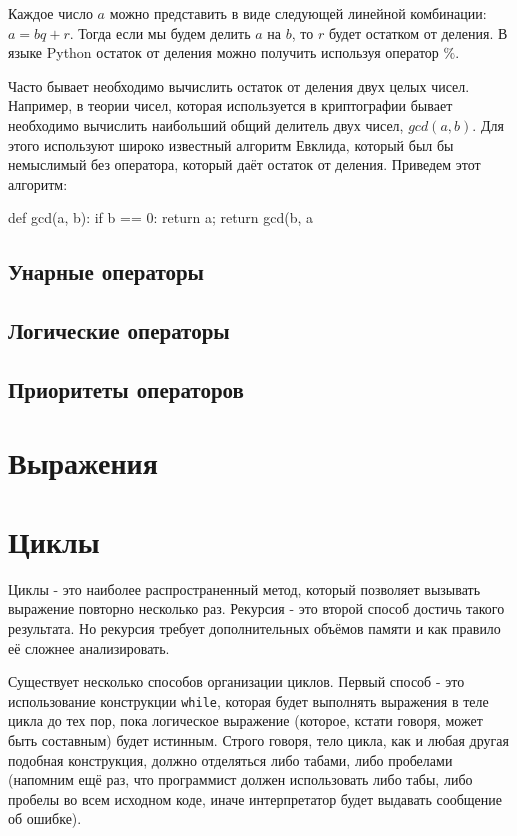 Каждое число $a$ можно представить в виде следующей линейной комбинации: $a=bq+r$.
Тогда если мы будем делить $a$ на $b$, то $r$ будет остатком от деления. В языке Python
остаток от деления можно получить используя оператор $\%$.

Часто бывает необходимо вычислить остаток от деления двух целых чисел. Например,
в теории чисел, которая используется в криптографии бывает необходимо вычислить 
наибольший общий делитель двух чисел, $gcd(a, b)$. Для этого используют широко известный 
алгоритм Евклида, который был бы немыслимый без оператора, который даёт
остаток от деления. Приведем этот алгоритм:

\begin{python}
def gcd(a, b):
	if b == 0:
		return a;
	return gcd(b, a %
\end{python}

\subsection{Унарные операторы}

\subsection{Логические операторы}

\subsection{Приоритеты операторов}

\section{Выражения}

\section{Циклы}

Циклы - это наиболее распространенный метод, который позволяет
вызывать выражение повторно несколько раз. Рекурсия - это 
второй способ достичь такого результата. Но рекурсия требует 
дополнительных объёмов памяти и как правило её сложнее 
анализировать.

Существует несколько способов организации циклов. Первый способ
- это использование конструкции \texttt{while}, которая будет 
выполнять выражения в теле цикла до тех пор, пока логическое 
выражение (которое, кстати говоря, может быть составным) будет
истинным. Строго говоря, тело цикла, как и любая другая подобная 
конструкция, должно отделяться либо табами, либо пробелами (напомним
ещё раз, что программист должен использовать либо табы, либо пробелы 
во всем исходном коде, иначе интерпретатор будет выдавать сообщение 
об ошибке). 

